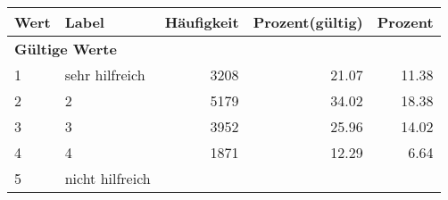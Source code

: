      \begin{longtable}{lXrrr}
     \toprule
     \textbf{Wert} & \textbf{Label} & \textbf{Häufigkeit} & \textbf{Prozent(gültig)} & \textbf{Prozent} \\
     \endhead
     \midrule
     \multicolumn{5}{l}{\textbf{Gültige Werte}}\\

     1 &
     \multicolumn{1}{X}{ sehr hilfreich   } &


       \num{3208} &
       \num[round-mode=places,round-precision=2]{21.07} &
         \num[round-mode=places,round-precision=2]{11.38} \\

     2 &
     \multicolumn{1}{X}{ 2   } &


       \num{5179} &
       \num[round-mode=places,round-precision=2]{34.02} &
         \num[round-mode=places,round-precision=2]{18.38} \\

     3 &
     \multicolumn{1}{X}{ 3   } &


       \num{3952} &
       \num[round-mode=places,round-precision=2]{25.96} &
         \num[round-mode=places,round-precision=2]{14.02} \\

     4 &
     \multicolumn{1}{X}{ 4   } &


       \num{1871} &
       \num[round-mode=places,round-precision=2]{12.29} &
         \num[round-mode=places,round-precision=2]{6.64} \\

     5 &
     \multicolumn{1}{X}{ nicht hilfreich   } &



\end{longtable}
